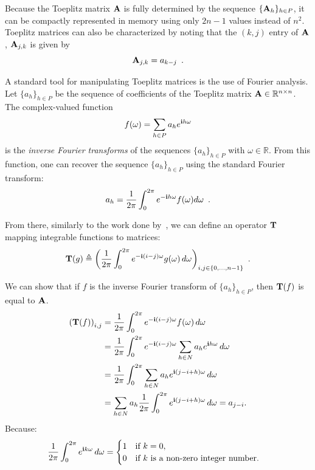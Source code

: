 \noindent
Because the Toeplitz matrix $\mathbf{A}$ is fully determined by the sequence $\{\mathbf{A}_h\}_{h \in P}$, it can be compactly represented in memory using only $2n-1$ values instead of $n^2$.
Toeplitz matrices can also be characterized by noting that the $(k,j)$ entry of $\mathbf{A}$, $\mathbf{A}_{j,k}$ is given by
\begin{equation}
  \mathbf{A}_{j,k} = a_{k-j} \enspace.
\end{equation}

\noindent
A standard tool for manipulating Toeplitz matrices is the use of Fourier analysis.
Let $\{a_h\}_{h \in P}$ be the sequence of coefficients of the Toeplitz matrix $\mathbf{A} \in \mathbb{R}^{n\times n}$.
The complex-valued function 
\begin{equation}
  f(\omega) = \sum_{h \in P} a_h e^{\mathbf{i} h \omega}
\end{equation}
is the \emph{inverse Fourier transforms} of the sequences $\{a_h\}_{h \in P}$ with $\omega \in \mathbb{R}$.
From this function, one can recover the sequence $\{a_h\}_{h \in P}$ using the standard Fourier transform:
\begin{equation}
  a_h = \frac{1}{2\pi} \int_0^{2\pi} e^{-\mathbf{i} h \omega} f(\omega) d\omega \enspace. 
\end{equation}

\noindent
From there, similarly to the work done by~\citet{gray2006toeplitz}, we can define an operator $\mathbf{T}$ mapping integrable functions to matrices:
\begin{equation}
  \Tmat(g) \triangleq \leftmat\frac{1}{2\pi}\int_{0}^{2\pi}e^{-\ci(i-j)\omega}g(\omega)\,d\omega\rightmat_{i,j\in\{0,\ldots,n-1\}} \enspace.
  \label{equation:ch2-toeplitz_operator}
\end{equation}

\noindent
We can show that if $f$ is the inverse Fourier transform of $\{a_h\}_{h \in P}$, then $\mathbf{T}(f)$ is equal to $\mathbf{A}$.
\begingroup
\allowdisplaybreaks
  \begin{align}
      \leftmat \Tmat(f) \rightmat_{i, j} &= \frac{1}{2\pi} \int_0^{2\pi} e^{-\ci (i-j)\omega} f(\omega) \,d\omega  \\
      &= \frac{1}{2\pi} \int_0^{2\pi} e^{-\ci (i-j) \omega} \sum_{h \in N} a_h e^{\ci h \omega} \,d\omega  \\
      &= \frac{1}{2\pi} \int_0^{2\pi} \sum_{h \in N} a_h e^{\ci (j - i + h) \omega} \,d\omega  \\
      &= \sum_{h \in N} a_h \frac{1}{2\pi} \int_0^{2\pi} e^{\ci (j - i + h) \omega} \,d\omega 
      = a_{j-i} .
  \end{align}
\endgroup
Because:
\begin{equation}
  \frac{1}{2\pi} \int_0^{2\pi} e^{\mathbf{i} k \omega} \,d\omega = 
  \begin{cases}
    1 \quad \text{if}\ k = 0, \\
    0 \quad \text{if}\ k\ \text{is a non-zero integer number.}
  \end{cases}
\end{equation}

